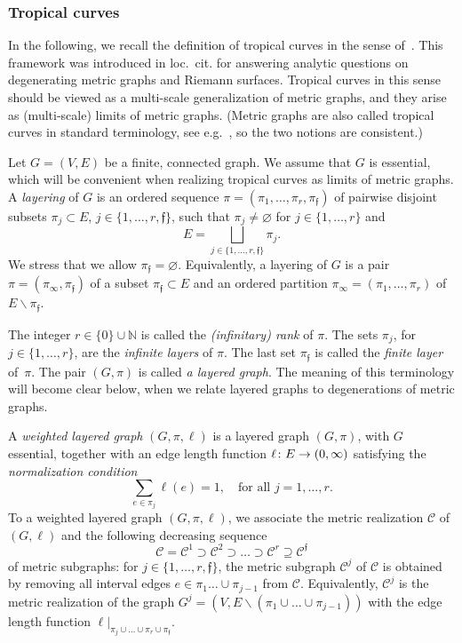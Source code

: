\documentclass[AHL,Unicode,longabstracts]{cedram}
\newcommand{\rest}[1]{\vert_{#1}}
\newcommand{\N}{\mathbb{N}}
\newcommand{\curve}{\mathcal{C}}
\newcommand{\fin}{\mathfrak f}
\renewcommand{\setminus}{\smallsetminus}
\renewcommand*{\to}{\mathchoice{\longrightarrow}{\rightarrow}{\rightarrow}{\rightarrow}}
\begin{document}
\subsubsection{Tropical curves} \label{ss:TropicalCurves}
In the following, we recall the definition of tropical curves in the sense of~\cite{AN2,AN}. This framework was introduced in loc.~cit. for answering analytic questions on degenerating metric graphs and Riemann surfaces. Tropical curves in this sense should be viewed as a multi-scale generalization of metric graphs, and they arise as (multi-scale) limits of metric graphs. (Metric graphs are also called tropical curves in standard terminology, see e.g.~\cite{BJ16, MZ08}, so the two notions are consistent.)



Let $G=(V,E)$ be a finite, connected graph. We assume that $G$ is essential, which will be convenient when realizing tropical curves as limits of metric graphs. A \emph{layering} of $G$ is an ordered sequence $\pi = (\pi_1, \dots, \pi_r, \pi_\fin)$ of pairwise disjoint subsets $\pi_j \subset E$, $j \in \{1, \dots, r, \fin\}$, such that $\pi_j \neq \varnothing$ for $j \in \{1,\dots, r\}$ and
\[
E = \bigsqcup_{j \in \{1, \dots, r, \fin \}} \pi_j.
\]
We stress that we allow $\pi_\fin = \varnothing$. Equivalently, a layering of $G$ is a pair $\pi = (\pi_\infty, \pi_\fin)$ of a subset $\pi_\fin \subset E$ and an ordered partition $\pi_\infty=(\pi_1, \dots, \pi_r)$ of $E \setminus \pi_\fin$.

The integer $r \in \{0\} \cup \N $ is called the \emph{(infinitary) rank} of $\pi$. The sets $\pi_j$, for $j \in\{1, \dots, r\}$, are the \emph{infinite layers} of $\pi$. The last set $\pi_\fin$ is called the \emph{finite layer} of~$\pi$. The pair $(G, \pi)$ is called \emph{a layered graph}. The meaning of this terminology will become clear below, when we relate layered graphs to degenerations of metric graphs.

A \emph{weighted layered graph} $(G, \pi, \ell)$ is a layered graph $(G,\pi)$, with $G$ essential, together with an edge length function $\ell \colon E \to (0, \infty)$ satisfying the \emph{normalization condition}
\[
\sum_{e \in \pi_j} \ell(e) = 1, \quad \text{for all } j =1, \dots, r.
\]
To a weighted layered graph $(G, \pi, \ell)$, we associate the metric realization $\curve$ of $(G, \ell)$ and the following decreasing sequence
\begin{equation}\label{eq:DecreasingSubgraphs}
\curve = \curve^1 \supset \curve^2 \supset \dots \supset \curve^r \supseteq \curve^{\fin}
\end{equation}
of metric subgraphs: for $j \in \{1, \dots, r, \fin\}$, the metric subgraph $\curve^j$ of $\curve$ is obtained by removing all interval edges $e \in \pi_1\dots \cup \pi_{j-1}$ from $\curve$. Equivalently, $\curve^j$ is the metric realization of the graph $G^j = (V, E \setminus (\pi_1 \cup \dots \cup \pi_{j-1}))$ with the edge length function $\ell\rest{\pi_{j} \cup\dots \cup\pi_r \cup \pi_\fin}$.
\end{document}
